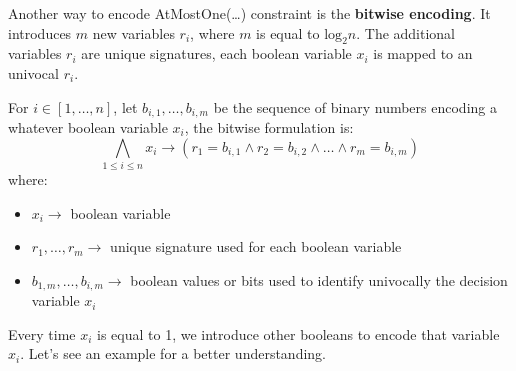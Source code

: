 Another way to encode AtMostOne(\dots) constraint is the \textbf{bitwise encoding}. It introduces $m$ new variables $r_i$, where $m$ is equal to $\text{log}_2n$.
The additional variables $r_i$ are unique signatures, each boolean variable $x_i$ is mapped to an univocal $r_i$. \vspace{7pt}

For $i \in [1, \dots, n]$, let $b_{i,1}, \dots, b_{i,m}$ be the sequence of binary numbers encoding a whatever boolean variable $x_i$, the bitwise formulation is:
$$\bigwedge_{1 \leq i \leq n} x_i \rightarrow (r_1 = b_{i,1} \wedge r_2 = b_{i,2} \wedge \dots \wedge r_m = b_{i,m})$$ 
where:
\begin{itemize}
    \renewcommand{\labelitemi}{-}
    \item $x_i \rightarrow$ boolean variable
    \item $r_1, \dots, r_m \rightarrow$ unique signature used for each boolean variable
    \item $b_{1,m}, \dots, b_{i,m} \rightarrow$ boolean values or bits used to identify univocally the decision variable $x_i$
\end{itemize}
Every time $x_i$ is equal to 1, we introduce other booleans to encode that variable $x_i$. Let's see an example for a better understanding.
